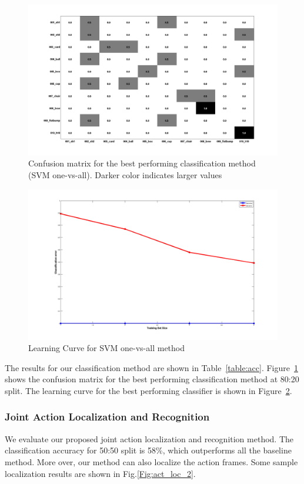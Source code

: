 \documentclass[10pt,twocolumn,letterpaper]{article}
\begin{document}
\begin{figure}[ht]
\includegraphics[scale=0.16]{conf_svm_ovr.png}
\caption{Confusion matrix for the best performing classification method (SVM one-vs-all). Darker color indicates larger values}
\label{Fig:conf_mat}
\end{figure}

\begin{figure}[ht]
\centering
\includegraphics[scale=0.18]{svm_ovr_lc.png}
\caption{Learning Curve for SVM one-vs-all method}

\label{Fig:lc}
\end{figure}

The results for our classification method are shown in Table~\ref{table:acc}. Figure~\ref{Fig:conf_mat} shows the confusion matrix for the best performing classification method at 80:20 split. The learning curve for the best performing classifier is shown in Figure~\ref{Fig:lc}.

\subsubsection{Joint Action Localization and Recognition}
We evaluate our proposed joint action localization and recognition method. The classification accuracy for 50:50 split is 58\%, which outperforms all the baseline method. More over, our method can also localize the action frames. Some sample localization results are shown in Fig.\ref{Fig:act_loc_2}.
\end{document}
